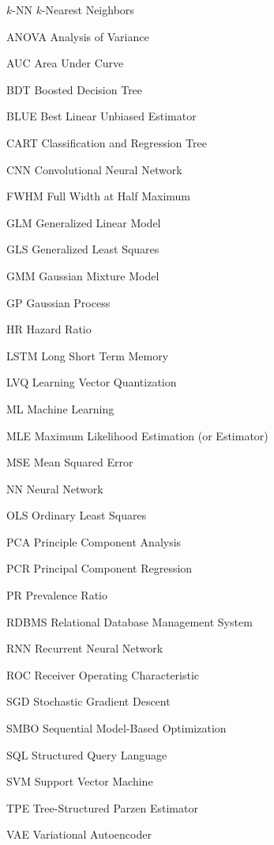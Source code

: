 \begin{symbollist}
	\item[$k$-NN] $k$-Nearest Neighbors
	\item[ANOVA] Analysis of Variance
	\item[AUC] Area Under Curve
	\item[BDT] Boosted Decision Tree
	\item[BLUE] Best Linear Unbiased Estimator
	\item[CART] Classification and Regression Tree
	\item[CNN] Convolutional Neural Network
	\item[FWHM] Full Width at Half Maximum
	\item[GLM] Generalized Linear Model
	\item[GLS] Generalized Least Squares
	\item[GMM] Gaussian Mixture Model
	\item[GP] Gaussian Process
	\item[HR] Hazard Ratio
	\item[LSTM] Long Short Term Memory
	\item[LVQ] Learning Vector Quantization
	\item[ML] Machine Learning
	\item[MLE] Maximum Likelihood Estimation (or Estimator)
	\item[MSE] Mean Squared Error
	\item[NN] Neural Network
	\item[OLS] Ordinary Least Squares
	\item[PCA] Principle Component Analysis
	\item[PCR] Principal Component Regression
	\item[PR] Prevalence Ratio
	\item[RDBMS] Relational Database Management System
	\item[RNN] Recurrent Neural Network
	\item[ROC] Receiver Operating Characteristic
	\item[SGD] Stochastic Gradient Descent
	\item[SMBO] Sequential Model-Based Optimization
	\item[SQL] Structured Query Language
	\item[SVM] Support Vector Machine
	\item[TPE] Tree-Structured Parzen Estimator
	\item[VAE] Variational Autoencoder
\end{symbollist}
